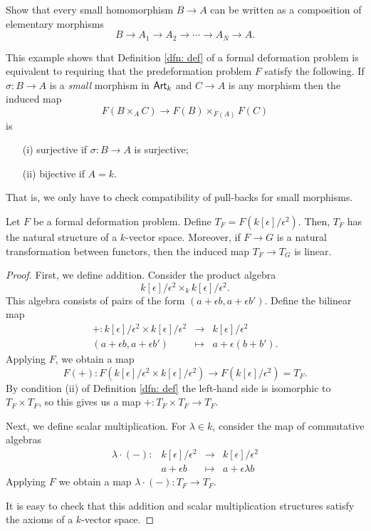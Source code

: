 \documentclass[11pt]{amsart}
\begin{document}
\begin{ex} 
Show that every small homomorphism $B \to A$ can be written as a composition of elementary morphisms
\[
B \to A_1 \to A_2 \to \cdots \to A_N \to A .
\]
\end{ex}

\begin{rmk}
This example shows that Definition \ref{dfn: def} of a formal deformation problem is equivalent to requiring that the predeformation problem $F$ satisfy the following. 
If $\sigma : B \to A$ is a {\em small} morphism in ${\sf Art}_k$ and $C \to A$ is any morphism then the induced map
\[
F(B \times_A C) \to F(B) \times_{F(A)} F(C)
\]
is
\begin{enumerate}
\item[(i)] surjective if $\sigma : B \to A$ is surjective;
\item[(ii)] bijective if $A = k$.
\end{enumerate}
That is, we only have to check compatibility of pull-backs for small morphisms. 
\end{rmk}

\begin{prop} Let $F$ be a formal deformation problem. 
Define $T_F = F(k[\epsilon]/\epsilon^2)$. 
Then, $T_F$ has the natural structure of a $k$-vector space. 
Moreover, if $F \to G$ is a natural transformation between functors, then the induced map $T_F \to T_G$ is linear. 
\end{prop}
\begin{proof}
First, we define addition.
Consider the product algebra
\[
k[\epsilon]/\epsilon^2 \times_k k[\epsilon]/\epsilon^2 .
\]
This algebra consists of pairs of the form $(a + \epsilon b, a + \epsilon b')$. 
Define the bilinear map
\[
\begin{array}{cccc}
+ : k[\epsilon]/\epsilon^2 \times k[\epsilon]/\epsilon^2 & \to & k[\epsilon]/\epsilon^2 \\
(a + \epsilon b, a+ \epsilon b') & \mapsto & a + \epsilon (b + b') .
\end{array}
\]
Applying $F$, we obtain a map
\[
F(+) : F\left(k[\epsilon]/\epsilon^2 \times k[\epsilon]/\epsilon^2\right) \to F\left(k[\epsilon]/\epsilon^2\right) = T_F .
\]
By condition (ii) of Definition \ref{dfn: def} the left-hand side is isomorphic to $T_F \times T_F$, so this gives us a map $+ : T_F \times T_F \to T_F$. 

Next, we define scalar multiplication. 
For $\lambda \in k$, consider the map of commutative algebras
\[
\begin{array}{cccc}
\lambda \cdot (-) : & k[\epsilon]/\epsilon^2 & \to & k[\epsilon]/\epsilon^2 \\
& a + \epsilon b & \mapsto & a + \epsilon \lambda b
\end{array}
\]
Applying $F$ we obtain a map $\lambda \cdot (-) : T_F \to T_F$. 

It is easy to check that this addition and scalar multiplication structures satisfy the axioms of a $k$-vector space. 
\end{proof}
\end{document}
